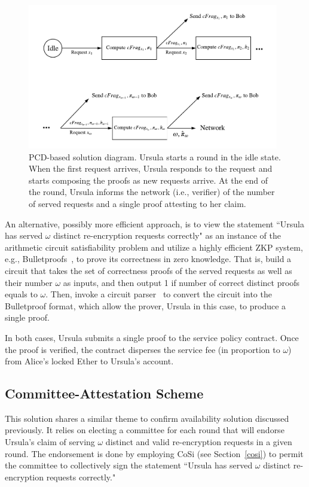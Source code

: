 \begin{figure}[h!]
\centerline{
\includegraphics[height= 2.5in, width = 1.0\columnwidth]{figures/pcd-based-sol.pdf}}
\caption{PCD-based solution diagram. Ursula starts a round in the idle state. When the first request arrives, Ursula responds to the request and starts composing the proofs as new requests arrive. At the end of the round, Ursula informs the network (i.e., verifier) of the number of served requests and a single proof attesting to her claim. }
\label{pcd-based-sol}
\end{figure}


An alternative, possibly more efficient approach, is to view the statement ``Ursula has served $\omega$ distinct re-encryption requests correctly" as an instance of the arithmetic circuit satisfiability problem and utilize a highly efficient ZKP system, e.g., Bulletproofs~\cite{bunz18}, to prove its correctness in zero knowledge. That is, build a circuit that takes the set of correctness proofs of the served requests as well as their number $\omega$ as inputs, and then output 1 if number of correct distinct proofs equals to $\omega$. Then, invoke a circuit parser~\cite{bunz18} to convert the circuit into the Bulletproof format, which allow the prover, Ursula in this case, to produce a single proof. 


In both cases, Ursula submits a single proof to the service policy contract. Once the proof is verified, the contract disperses the service fee (in proportion to $\omega$) from Alice's locked Ether to Ursula's account.


\subsection{Committee-Attestation Scheme}
This solution shares a similar theme to confirm availability solution discussed previously. It relies on electing a committee for each round that will endorse Ursula's claim of serving $\omega$ distinct and valid re-encryption requests in a given round. The endorsement is done by employing CoSi (see Section~\ref{cosi}) to permit the committee to collectively sign the statement ``Ursula has served $\omega$ distinct re-encryption requests correctly."  


